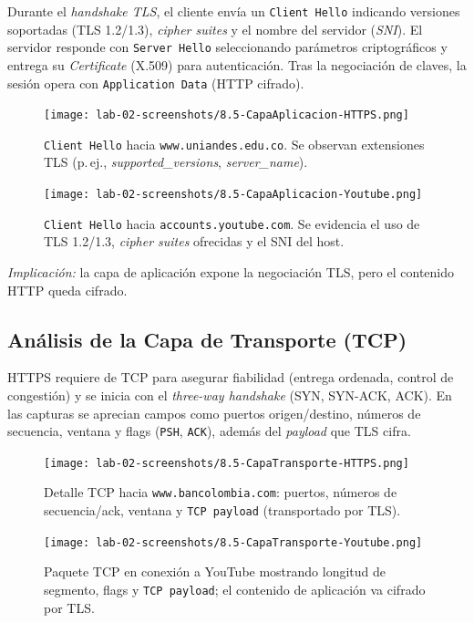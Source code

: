 \documentclass[10pt]{article}
\begin{document}
Durante el \textit{handshake TLS}, el cliente envía un \texttt{Client Hello} indicando versiones soportadas (TLS 1.2/1.3), \textit{cipher suites} y el nombre del servidor (\textit{SNI}). 
El servidor responde con \texttt{Server Hello} seleccionando parámetros criptográficos y entrega su \textit{Certificate} (X.509) para autenticación. 
Tras la negociación de claves, la sesión opera con \texttt{Application Data} (HTTP cifrado).

\begin{figure}[H]
    \centering
    \texttt{[image: lab-02-screenshots/8.5-CapaAplicacion-HTTPS.png]}
    \caption{\texttt{Client Hello} hacia \texttt{www.uniandes.edu.co}. Se observan extensiones TLS (p.\,ej., \textit{supported\_versions}, \textit{server\_name}).}
\end{figure}

\begin{figure}[H]
    \centering
    \texttt{[image: lab-02-screenshots/8.5-CapaAplicacion-Youtube.png]}
    \caption{\texttt{Client Hello} hacia \texttt{accounts.youtube.com}. Se evidencia el uso de TLS 1.2/1.3, \textit{cipher suites} ofrecidas y el SNI del host.}
\end{figure}

\noindent\textit{Implicación:} la capa de aplicación expone la negociación TLS, pero el contenido HTTP queda cifrado.

\subsection*{Análisis de la Capa de Transporte (TCP)}

HTTPS requiere de TCP para asegurar fiabilidad (entrega ordenada, control de congestión) y se inicia con el \textit{three-way handshake} (SYN, SYN-ACK, ACK). 
En las capturas se aprecian campos como puertos origen/destino, números de secuencia, ventana y flags (\texttt{PSH}, \texttt{ACK}), además del \textit{payload} que TLS cifra.

\begin{figure}[H]
    \centering
    \texttt{[image: lab-02-screenshots/8.5-CapaTransporte-HTTPS.png]}
    \caption{Detalle TCP hacia \texttt{www.bancolombia.com}: puertos, números de secuencia/ack, ventana y \texttt{TCP payload} (transportado por TLS).}
\end{figure}

\begin{figure}[H]
    \centering
    \texttt{[image: lab-02-screenshots/8.5-CapaTransporte-Youtube.png]}
    \caption{Paquete TCP en conexión a YouTube mostrando longitud de segmento, flags y \texttt{TCP payload}; el contenido de aplicación va cifrado por TLS.}
\end{figure}
\end{document}
